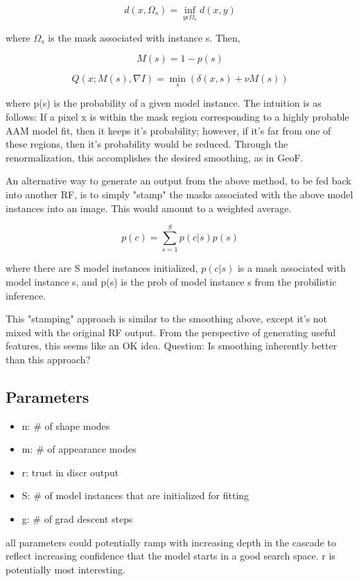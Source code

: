 \documentclass[10pt,twocolumn,letterpaper]{article}
\begin{document}
\[ d(x,\Omega _s) = \inf_{y \epsilon \Omega _s} d(x,y) \]

where $\Omega _s$ is the mask associated with instance s.  Then, 

\[ M(s) = 1 - p(s) \] 

\[ Q(x; M(s), \nabla I) = \min_{s} (\delta (x,s) + \nu M(s)) \]

where p(s) is the probability of a given model instance.  The intuition is as follows: If a pixel x is within the mask region corresponding to a highly probable AAM model fit, then it keeps it's probability; however, if it's far from one of these regions, then it's probability would be reduced.  Through the renormalization, this accomplishes the desired smoothing, as in GeoF.


An alternative way to generate an output from the above method, to be fed back into another RF, is to simply "stamp" the masks associated with the above model instances into an image.  This would amount to a weighted average.

\[ p(c) = \sum_{s=1}^S p(c|s)p(s) \]

where there are S model instances initialized, $p(c|s)$ is a mask associated with model instance s, and p(s) is the prob of model instance s from the probilistic inference.

This "stamping" approach is similar to the smoothing above, except it's not mixed with the original RF output.  From the perspective of generating useful features, this seems like an OK idea.  Question: Is smoothing inherently better than this approach?

\subsection{Parameters}

\begin{itemize}
\item n: \# of shape modes
\item m: \# of appearance modes
\item r: trust in discr output
\item S: \# of model instances that are initialized for fitting
\item g: \# of grad descent steps
\end{itemize}

all parameters could potentially ramp with increasing depth in the cascade to reflect increasing confidence that the model starts in a good search space.  r is potentially most interesting.
\end{document}
